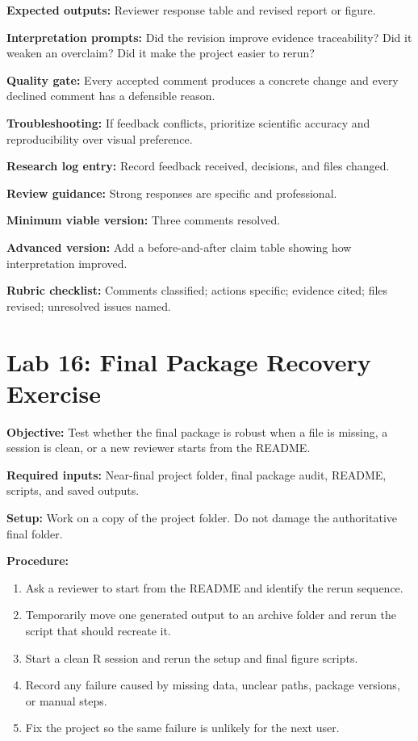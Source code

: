 \textbf{Expected outputs:} Reviewer response table and revised report or figure.

\textbf{Interpretation prompts:} Did the revision improve evidence traceability? Did it weaken an overclaim? Did it make the project easier to rerun?

\textbf{Quality gate:} Every accepted comment produces a concrete change and every declined comment has a defensible reason.

\textbf{Troubleshooting:} If feedback conflicts, prioritize scientific accuracy and reproducibility over visual preference.

\textbf{Research log entry:} Record feedback received, decisions, and files changed.

\textbf{Review guidance:} Strong responses are specific and professional.

\textbf{Minimum viable version:} Three comments resolved.

\textbf{Advanced version:} Add a before-and-after claim table showing how interpretation improved.

\textbf{Rubric checklist:} Comments classified; actions specific; evidence cited; files revised; unresolved issues named.

\section{Lab 16: Final Package Recovery Exercise}
\textbf{Objective:} Test whether the final package is robust when a file is missing, a session is clean, or a new reviewer starts from the README.

\textbf{Required inputs:} Near-final project folder, final package audit, README, scripts, and saved outputs.

\textbf{Setup:} Work on a copy of the project folder. Do not damage the authoritative final folder.

\textbf{Procedure:}
\begin{enumerate}
  \item Ask a reviewer to start from the README and identify the rerun sequence.
  \item Temporarily move one generated output to an archive folder and rerun the script that should recreate it.
  \item Start a clean R session and rerun the setup and final figure scripts.
  \item Record any failure caused by missing data, unclear paths, package versions, or manual steps.
  \item Fix the project so the same failure is unlikely for the next user.
\end{enumerate}

